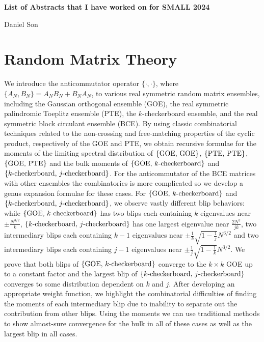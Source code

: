 \documentclass{article}
\begin{document}
\begin{center}
    \Large
    \textbf{List of Abstracts that I have worked on for SMALL 2024}

    \large
    Daniel Son
\end{center}

\section{Random Matrix Theory}


We introduce the anticommutator operator $\{\cdot, \cdot\}$, where $\{A_N,B_N\} = A_NB_N + B_NA_N$, to various real symmetric random matrix ensembles, including the Gaussian orthogonal ensemble (GOE), the real symmetric palindromic Toeplitz ensemble (PTE), the $k$-checkerboard ensemble, and the real symmetric block circulant ensemble (BCE). By using classic combinatorial techniques related to the non-crossing and free-matching properties of the cyclic product, respectively of the GOE and PTE, we obtain recursive formulae for the moments of the limiting spectral distribution of $\{\textup{GOE, GOE}\}$, $\{\textup{PTE, PTE}\}$, $\{\textup{GOE, PTE}\}$ and the bulk moments of $\{\textup{GOE, }k\textup{-checkerboard}\}$ and $\{k\textup{-checkerboard, }j\textup{-checkerboard}\}$. For the anticommutator of the BCE matrices with other ensembles the combinatorics is more complicated so we develop a genus expansion formulae for these cases. For $\{\textup{GOE, }k\textup{-checkerboard}\}$ and $\{k\textup{-checkerboard, }j\textup{-checkerboard}\}$, we observe vastly different blip behaviors: while $\{\textup{GOE, }k\textup{-checkerboard}\}$ has two blips each containing $k$ eigenvalues near $\pm\frac{N^{3/2}}{k}$, $\{k\textup{-checkerboard, }j\textup{-checkerboard}\}$ has one largest eigenvalue near $\frac{2N^2}{jk}$, two intermediary blips each containing $k-1$ eigenvalues near $\pm \frac{1}{k}\sqrt{1-\frac{1}{j}}N^{3/2}$ and two intermediary blips each containing $j-1$ eigenvalues near $\pm\frac{1}{j}\sqrt{1-\frac{1}{k}}N^{3/2}$. We prove that both blips of $\{\textup{GOE, }k\textup{-checkerboard}\}$ converge to the $k\times k$ GOE up to a constant factor and the largest blip of $\{k\textup{-checkerboard, }j\textup{-checkerboard}\}$ converges to some distribution dependent on $k$ and $j$. After developing an appropriate weight function, we highlight the combinatorial difficulties of finding the moments of each intermediary blip due to inability to separate out the contribution from other blips. Using the moments we can use traditional methods to show almost-sure convergence for the bulk in all of these cases as well as the largest blip in all cases.
\end{document}
